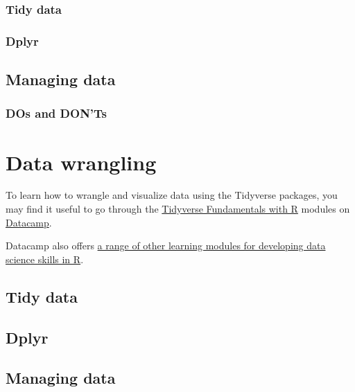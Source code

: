 \documentclass[
]{book}
\begin{document}
\hypertarget{tidy-data}{%
\subsection{Tidy data}\label{tidy-data}}

\hypertarget{dplyr}{%
\subsection{Dplyr}\label{dplyr}}

\hypertarget{managing-data}{%
\section{Managing data}\label{managing-data}}

\hypertarget{dos-and-donts}{%
\subsection{DOs and DON'Ts}\label{dos-and-donts}}

\hypertarget{data-wrangling-1}{%
\chapter{Data wrangling}\label{data-wrangling-1}}

To learn how to wrangle and visualize data using the Tidyverse packages, you may find it useful to go through the \href{https://learn.datacamp.com/skill-tracks/tidyverse-fundamentals}{Tidyverse Fundamentals with R} modules on \href{https://learn.datacamp.com/}{Datacamp}.

Datacamp also offers \href{https://learn.datacamp.com/career-tracks/data-scientist-with-r}{a range of other learning modules for developing data science skills in R}.

\hypertarget{tidy-data-1}{%
\section{Tidy data}\label{tidy-data-1}}

\hypertarget{dplyr-1}{%
\section{Dplyr}\label{dplyr-1}}

\hypertarget{managing-data-1}{%
\section{Managing data}\label{managing-data-1}}
\end{document}
